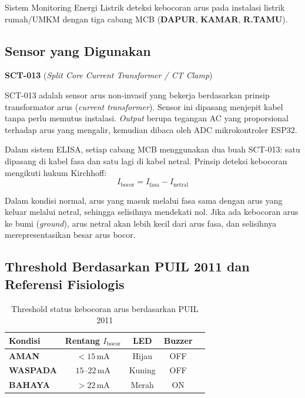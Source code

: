 \documentclass[12pt,a4paper]{article}
\begin{document}
Sistem Monitoring Energi Listrik deteksi kebocoran arus pada instalasi listrik
rumah/UMKM dengan tiga cabang MCB (\textbf{DAPUR}, \textbf{KAMAR},
\textbf{R.TAMU}).

\subsection{Sensor yang Digunakan}

\textbf{SCT-013} (\textit{Split Core Current Transformer / CT Clamp})

SCT-013 adalah sensor arus non-invasif yang bekerja berdasarkan prinsip
transformator arus (\textit{current transformer}). Sensor ini dipasang menjepit
kabel tanpa perlu memutus instalasi. \textit{Output} berupa tegangan AC yang
proporsional terhadap arus yang mengalir, kemudian dibaca oleh ADC
mikrokontroler ESP32.

Dalam sistem ELISA, setiap cabang MCB menggunakan dua buah SCT-013: satu
dipasang di kabel fasa dan satu lagi di kabel netral. Prinsip deteksi kebocoran
mengikuti hukum Kirchhoff:
\[
    I_{\text{bocor}} = I_{\text{fasa}} - I_{\text{netral}}
\]

Dalam kondisi normal, arus yang masuk melalui fasa sama dengan arus yang keluar
melalui netral, sehingga selisihnya mendekati nol. Jika ada kebocoran arus ke
bumi (\textit{ground}), arus netral akan lebih kecil dari arus fasa, dan
selisihnya merepresentasikan besar arus bocor.

\subsection{Threshold Berdasarkan PUIL 2011 dan Referensi Fisiologis}

\begin{table}[H]
    \centering
    \caption{Threshold status kebocoran arus berdasarkan PUIL 2011}
    \begin{tabular}{>{\bfseries}lcccc}
        \toprule
        Kondisi  & Rentang $I_{\text{bocor}}$ & LED    & Buzzer \\
        \midrule
        AMAN     & $< 15\,\text{mA}$          & Hijau  & OFF    \\
        WASPADA  & $15\text{--}22\,\text{mA}$ & Kuning & OFF    \\
        BAHAYA   & $> 22\,\text{mA}$          & Merah  & ON     \\
        \bottomrule
    \end{tabular}
\end{table}
\end{document}
